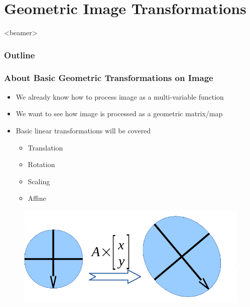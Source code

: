 \section{Geometric Image Transformations}
\begin{frame}<beamer>
    \frametitle{Outline}
    \tableofcontents[currentsection]
\end{frame}

\begin{frame}
\frametitle {About Basic Geometric Transformations on Image}
\begin{itemize}
	\item {We already know how to process image as a multi-variable function}
	\item {We want to see how image is processed as a geometric matrix/map}
	\item {Basic linear transformations will be covered}
	\begin{itemize}
		\item {Translation}
		\item {Rotation}
		\item {Scaling}
		\item {Affine}
	\end{itemize}
\end{itemize}
\begin{figure}
	{\includegraphics[width=0.5\linewidth]{./figs/imgtrans_demo.pdf}}
\end{figure}
\end{frame}

